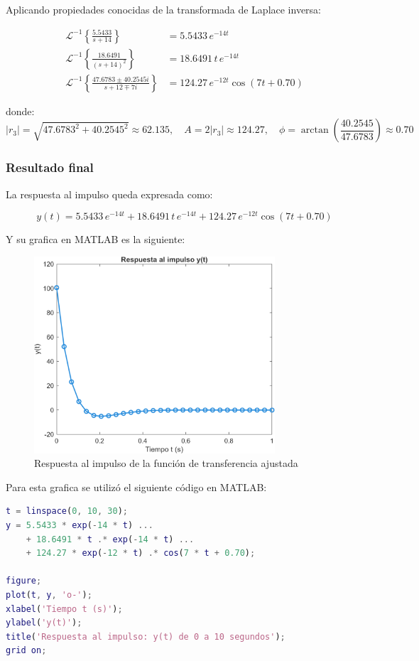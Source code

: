 \documentclass[11pt,letterpaper]{article}
\begin{document}
Aplicando propiedades conocidas de la transformada de Laplace inversa:

\begin{align}
\mathcal{L}^{-1}\left\{ \frac{5.5433}{s + 14} \right\} &= 5.5433\, e^{-14t} \\
\mathcal{L}^{-1}\left\{ \frac{18.6491}{(s + 14)^2} \right\} &= 18.6491\, t\, e^{-14t} \\
\mathcal{L}^{-1}\left\{ 
\frac{47.6783 \pm 40.2545i}{s + 12 \mp 7i}
\right\} &= 124.27\, e^{-12t} \cos(7t + 0.70)
\end{align}

\noindent
donde:
\[
|r_3| = \sqrt{47.6783^2 + 40.2545^2} \approx 62.135,\quad
A = 2|r_3| \approx 124.27, \quad \phi = \arctan\left( \frac{40.2545}{47.6783} \right) \approx 0.70
\]

\subsubsection{Resultado final}

La respuesta al impulso queda expresada como:

\begin{equation}
y(t) = 5.5433\, e^{-14t} + 18.6491\, t\, e^{-14t} + 124.27\, e^{-12t} \cos(7t + 0.70)
\end{equation}

Y su grafica en MATLAB es la siguiente:
\begin{figure}[H]
\centering
\includegraphics[width=0.8\textwidth]{./img/2-a-1.png}
\caption{Respuesta al impulso de la función de transferencia ajustada}
\label{fig:impulso}
\end{figure}

Para esta grafica se utilizó el siguiente código en MATLAB:
\begin{lstlisting}[language=Matlab, caption={Respuesta al impulso del sistema ajustado}]
t = linspace(0, 10, 30);
y = 5.5433 * exp(-14 * t) ...
    + 18.6491 * t .* exp(-14 * t) ...
    + 124.27 * exp(-12 * t) .* cos(7 * t + 0.70);

figure;
plot(t, y, 'o-');
xlabel('Tiempo t (s)');
ylabel('y(t)');
title('Respuesta al impulso: y(t) de 0 a 10 segundos');
grid on;
\end{lstlisting}
\end{document}
